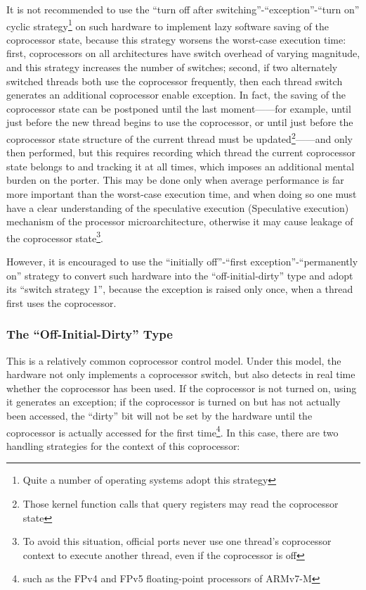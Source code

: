 It is not recommended to use the ``turn off after switching''-``exception''-``turn on'' cyclic strategy\footnote{Quite a number of operating systems adopt this strategy} on such hardware to implement lazy software saving of the coprocessor state, because this strategy worsens the worst-case execution time: first, coprocessors on all architectures have switch overhead of varying magnitude, and this strategy increases the number of switches; second, if two alternately switched threads both use the coprocessor frequently, then each thread switch generates an additional coprocessor enable exception. In fact, the saving of the coprocessor state can be postponed until the last moment------for example, until just before the new thread begins to use the coprocessor, or until just before the coprocessor state structure of the current thread must be updated\footnote{Those kernel function calls that query registers may read the coprocessor state}------and only then performed, but this requires recording which thread the current coprocessor state belongs to and tracking it at all times, which imposes an additional mental burden on the porter. This may be done only when average performance is far more important than the worst-case execution time, and when doing so one must have a clear understanding of the speculative execution (Speculative
execution) mechanism of the processor microarchitecture, otherwise it may cause leakage of the coprocessor state\footnote{To avoid this situation, official ports never use one thread's coprocessor context to execute another thread, even if the coprocessor is off}.

However, it is encouraged to use the ``initially off''-``first exception''-``permanently on'' strategy to convert such hardware into the ``off-initial-dirty'' type and adopt its ``switch strategy 1'', because the exception is raised only once, when a thread first uses the coprocessor.

\subsubsection{The ``Off-Initial-Dirty'' Type}\label{subsubsec:9-coproc-off-initial-dirty}

This is a relatively common coprocessor control model. Under this model, the hardware not only implements a coprocessor switch, but also detects in real time whether the coprocessor has been used. If the coprocessor is not turned on, using it generates an exception; if the coprocessor is turned on but has not actually been accessed, the ``dirty'' bit will not be set by the hardware until the coprocessor is actually accessed for the first time\footnote{such as the FPv4 and FPv5 floating-point processors of ARMv7-M}. In this case, there are two handling strategies for the context of this coprocessor:

